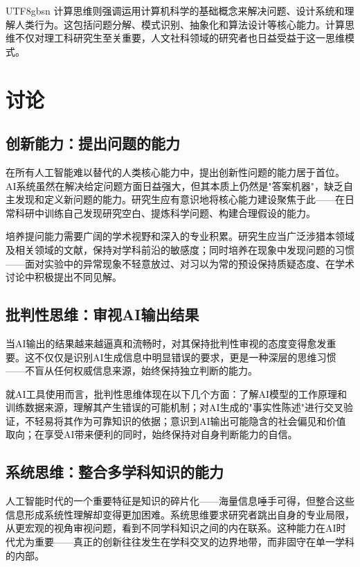 \documentclass[12pt,a4paper]{article}
\begin{document}
\begin{CJK}{UTF8}{gbsn}
计算思维则强调运用计算机科学的基础概念来解决问题、设计系统和理解人类行为。这包括问题分解、模式识别、抽象化和算法设计等核心能力。计算思维不仅对理工科研究生至关重要，人文社科领域的研究者也日益受益于这一思维模式。

\section{讨论}

\subsection{创新能力：提出问题的能力}

在所有人工智能难以替代的人类核心能力中，提出创新性问题的能力居于首位。AI系统虽然在解决给定问题方面日益强大，但其本质上仍然是"答案机器"，缺乏自主发现和定义新问题的能力。研究生应有意识地将核心能力建设聚焦于此——在日常科研中训练自己发现研究空白、提炼科学问题、构建合理假设的能力。

培养提问能力需要广阔的学术视野和深入的专业积累。研究生应当广泛涉猎本领域及相关领域的文献，保持对学科前沿的敏感度；同时培养在现象中发现问题的习惯——面对实验中的异常现象不轻意放过、对习以为常的预设保持质疑态度、在学术讨论中积极提出不同见解。

\subsection{批判性思维：审视AI输出结果}

当AI输出的结果越来越逼真和流畅时，对其保持批判性审视的态度变得愈发重要。这不仅仅是识别AI生成信息中明显错误的要求，更是一种深层的思维习惯——不盲从任何权威信息来源，始终保持独立判断的能力。

就AI工具使用而言，批判性思维体现在以下几个方面：了解AI模型的工作原理和训练数据来源，理解其产生错误的可能机制；对AI生成的"事实性陈述"进行交叉验证，不轻易将其作为可靠知识的依据；意识到AI输出可能隐含的社会偏见和价值取向；在享受AI带来便利的同时，始终保持对自身判断能力的自信。

\subsection{系统思维：整合多学科知识的能力}

人工智能时代的一个重要特征是知识的碎片化——海量信息唾手可得，但整合这些信息形成系统性理解却变得更加困难。系统思维要求研究者跳出自身的专业局限，从更宏观的视角审视问题，看到不同学科知识之间的内在联系。这种能力在AI时代尤为重要——真正的创新往往发生在学科交叉的边界地带，而非固守在单一学科的内部。


\end{CJK}
\end{document}
